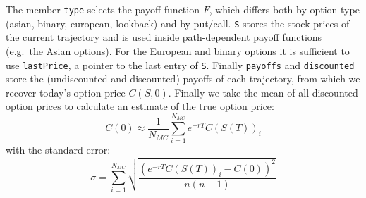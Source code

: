 \documentclass[11pt]{article}
\begin{document}
The member \texttt{type} selects the payoff function $F$, which differs both by option type (asian, binary, european, lookback) and by put/call. \texttt{S} stores the stock prices of the current trajectory and is used inside path-dependent payoff functions (e.g.\ the Asian options). For the European and binary options it is sufficient to use \texttt{lastPrice}, a pointer to the last entry of \texttt{S}. Finally \texttt{payoffs} and \texttt{discounted} store the (undiscounted and discounted) payoffs of each trajectory, from which we recover today's option price $C(S,0)$.
Finally we take the mean of all discounted option prices to calculate an estimate of the true option price:
\begin{equation}
    C(0) \approx \frac{1}{N_{MC}} \sum_{i=1}^{N_{MC}} e^{-rT} C(S(T))_i
\end{equation}
with the standard error:
\begin{equation}
    \sigma = \sum_{i=1}^{N_{MC}} \sqrt{\frac{(e^{-rT} C(S(T))_i - C(0))^2 }{n(n-1)}}
\end{equation}
\end{document}
